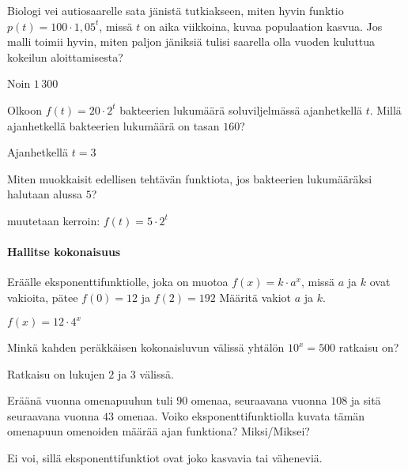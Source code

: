 \begin{tehtavasivu}
\begin{tehtava}
Biologi vei autiosaarelle sata jänistä tutkiakseen, miten hyvin funktio $ p(t)=100 \cdot 1,05^{t}$, missä $t$ on aika viikkoina, kuvaa populaation kasvua. Jos malli toimii hyvin, miten paljon jäniksiä tulisi saarella olla vuoden kuluttua kokeilun aloittamisesta?
\begin{vastaus}
Noin $1\,300$
\end{vastaus}
\end{tehtava}

\begin{tehtava}
Olkoon $f(t) = 20 \cdot 2^t$ bakteerien lukumäärä soluviljelmässä ajanhetkellä $t$. Millä ajanhetkellä bakteerien lukumäärä on tasan $160$?
\begin{vastaus}
Ajanhetkellä $t=3$ %
\end{vastaus}
\end{tehtava}

\begin{tehtava}
Miten muokkaisit edellisen tehtävän funktiota, jos bakteerien lukumääräksi halutaan alussa $5$?
\begin{vastaus}
muutetaan kerroin: $f(t) = 5 \cdot 2^t$
\end{vastaus}
\end{tehtava}

\paragraph*{Hallitse kokonaisuus}

\begin{tehtava}
Eräälle eksponenttifunktiolle, joka on muotoa $ f(x)=k\cdot a^{x}  $, missä $ a $ ja $ k $ ovat vakioita, pätee $ f(0)=12 $ ja $ f(2)=192 $ Määritä vakiot $a$ ja $k$.
\begin{vastaus}
$f(x)=12\cdot 4^{x}$
\end{vastaus}
\end{tehtava}


\begin{tehtava}
Minkä kahden peräkkäisen kokonaisluvun välissä yhtälön $10^x = 500$ ratkaisu on?
\begin{vastaus}
Ratkaisu on lukujen $2$ ja $3$ välissä.
\end{vastaus}
\end{tehtava}


\begin{tehtava}
Eräänä vuonna omenapuuhun tuli $90$ omenaa, seuraavana vuonna $108$ ja sitä seuraavana vuonna $43$ omenaa. Voiko eksponenttifunktiolla kuvata tämän omenapuun omenoiden määrää ajan funktiona? Miksi/Miksei?
\begin{vastaus}
Ei voi, sillä eksponenttifunktiot ovat joko kasvavia tai väheneviä.
\end{vastaus}
\end{tehtava}


\end{tehtavasivu}
